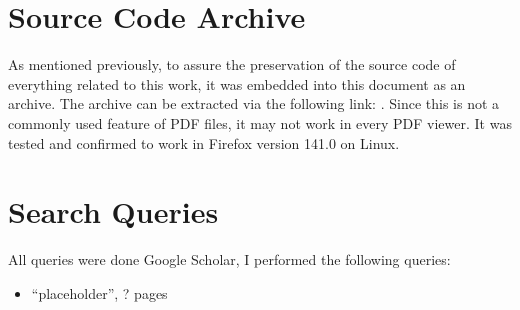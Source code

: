 \appendix

\section{Source Code Archive}
\label{app:source-code-archive}
As mentioned previously, to assure the preservation of the source code of everything related to this work, it was embedded into this document as an archive.
The archive can be extracted via the following link: .
Since this is not a commonly used feature of PDF files, it may not work in every PDF viewer.
It was tested and confirmed to work in Firefox version 141.0 on Linux.

\section{Search Queries}
\label{app:repro-search-queries}
All queries were done Google Scholar, I performed the following queries:
\begin{itemize}
    \item ``placeholder'', ? pages
\end{itemize}

